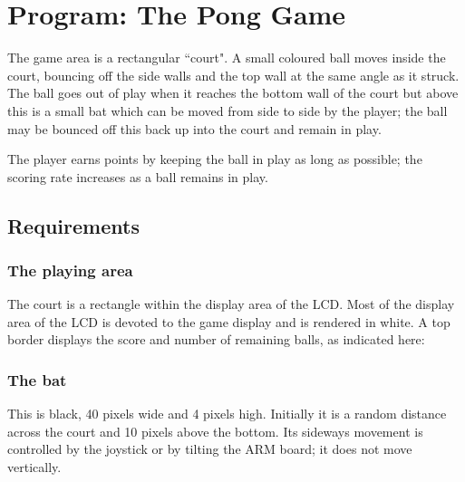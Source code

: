 \documentclass[a4paper]{article}
\begin{document}
\clearpage
\section{Program: The Pong Game}\label{progSpec}
The game area is a rectangular ``court". A small coloured ball moves
inside the court, bouncing off the side walls and the top wall at the
same angle as it struck.  The ball goes out of play when it reaches
the bottom wall of the court but above this is a small bat which can
be moved from side to side by the player; the ball may be bounced off
this back up into the court and remain in play.

The player earns points by keeping the ball in play as long as
possible; the scoring rate increases as a ball remains in play.
 

  
\subsection{Requirements} \label{reqts}

\subsubsection{The playing area}
The court is a rectangle within the display area of the LCD.  Most of
the display area of the LCD is devoted to the game display and is
rendered in white.  A top border displays the score and number of
remaining balls, as indicated here:

\begin{center}
\end{center}

\subsubsection{The bat}
This is black, 40 pixels wide and 4 pixels high. Initially it is a
random distance across the court and 10 pixels above the bottom. Its
sideways movement is controlled by the joystick or by tilting the ARM
board; it does not move vertically.
\end{document}
